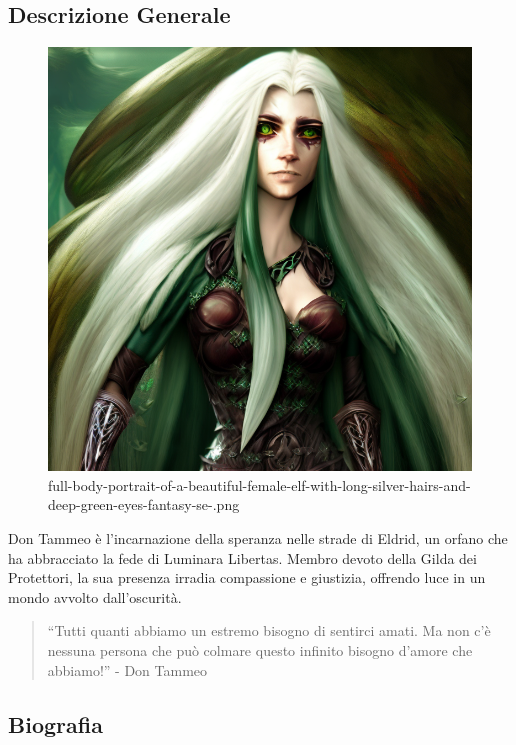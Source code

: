 \subsection{Descrizione Generale}\label{descrizione-generale}


\begin{figure}
\centering
\includegraphics{full-body-portrait-of-a-beautiful-female-elf-with-long-silver-hairs-and-deep-green-eyes-fantasy-se-.png}
\caption{full-body-portrait-of-a-beautiful-female-elf-with-long-silver-hairs-and-deep-green-eyes-fantasy-se-.png}
\end{figure}

Don Tammeo è l'incarnazione della speranza nelle strade di Eldrid, un
orfano che ha abbracciato la fede di Luminara Libertas. Membro devoto
della Gilda dei Protettori, la sua presenza irradia compassione e
giustizia, offrendo luce in un mondo avvolto dall'oscurità.

\begin{quote}
``Tutti quanti abbiamo un estremo bisogno di sentirci amati. Ma non c'è
nessuna persona che può colmare questo infinito bisogno d'amore che
abbiamo!'' - Don Tammeo
\end{quote}

\subsection{Biografia}\label{biografia}


